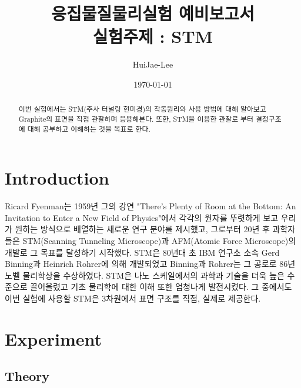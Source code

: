 \documentclass[aps,reprint,superscriptaddress]{revtex4-2}
\begin{document}
\title{응집물질물리실험 예비보고서 \\
\small 실험주제 : STM}

\author{HuiJae-Lee}
\date{\today}


\begin{abstract}
 이번 실험에서는 STM(주사 터널링 현미경)의 작동원리와 사용 방법에 대해 알아보고 
 Graphite의 표면을 직접 관찰하며 응용해본다. 또한, STM을 이용한 관찰로 부터 결정구조에 대해
 공부하고 이해하는 것을 목표로 한다.
\end{abstract}

\maketitle

\section[Introduction]{Introduction}
Ricard Fyenman는 1959년 그의 강연 "There's Plenty of Room at the Bottom: 
An Invitation to Enter a New Field of Physics"에서 각각의 
원자를 뚜렷하게 보고 우리가 원하는 방식으로 배열하는 새로운 연구 분야를 
제시했고, 그로부터 20년 후 과학자들은 STM(Scanning Tunneling Microscope)과 
AFM(Atomic Force Microscope)의 개발로 그 목표를 달성하기 시작했다. 
STM은 80년대 초 IBM 연구소 소속 Gerd Binning과 Heinrich Rohrer에 의해 개발되었고 
Binning과 Rohrer는 그 공로로 86년 노벨 물리학상을 수상하였다.
STM은 나노 스케일에서의 과학과 기술을 더욱 높은 수준으로 끌어올렸고 기초 물리학에 대한 
이해 또한 엄청나게 발전시켰다. 그 중에서도 이번 실험에 사용할 STM은 3차원에서 표면 구조를 
직접, 실제로 제공한다.
\section[Experiment]{Experiment}
\subsection{Theory}
\end{document}
